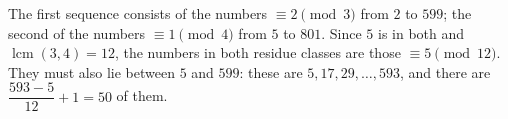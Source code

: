 The first sequence consists of the numbers $\equiv2\pmod3$ from $2$ to $599$; the second of the numbers $\equiv1\pmod4$ from $5$ to $801$. Since $5$ is in both and $\operatorname{lcm}(3,4)=12$, the numbers in both residue classes are those $\equiv5\pmod{12}$. They must also lie between $5$ and $599$: these are $5,17,29,\dots,593$, and there are $\dfrac{593-5}{12}+1=\boxed{50}$ of them.
